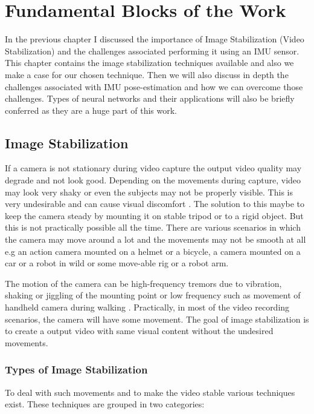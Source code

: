 \chapter{Fundamental Blocks of the Work} \label{chapter_two}

In the previous chapter I discussed the importance of Image Stabilization (Video Stabilization) and the challenges associated performing it using an IMU sensor. This chapter contains the image stabilization techniques available and also we make a case for our chosen technique. Then we will also discuss in depth the challenges associated with IMU pose-estimation and how we can overcome those challenges. Types of neural networks and their applications will also be briefly conferred as they are a huge part of this work.

\section{Image Stabilization}
\label{sec:image_stab}
If a camera is not stationary during video capture the output video quality may degrade and not look good. Depending on the movements during capture, video may look very shaky or even the subjects may not be properly visible. This is very undesirable and can cause visual discomfort \citep{jia2012probabilistic}. The solution to this maybe to keep the camera steady by mounting it on stable tripod or to a rigid object. But this is not practically possible all the time. There are various scenarios in which the camera may move around a lot and the movements may not be smooth at all e.g an action camera mounted on a helmet or a bicycle, a camera mounted on a car or a robot in wild or some move-able rig or a robot arm.

The motion of the camera can be high-frequency tremors due to vibration, shaking or jiggling of the mounting point \citep{ryu2012robust} or low frequency such as movement of handheld camera during walking \citep{dis_review}. Practically, in most of the video recording scenarios, the camera will have some movement. The goal of image stabilization is to create a output video with same visual content without the undesired movements. 

\subsection{Types of Image Stabilization}
To deal with such movements and to make the video stable various techniques exist. These techniques are grouped in two categories:

